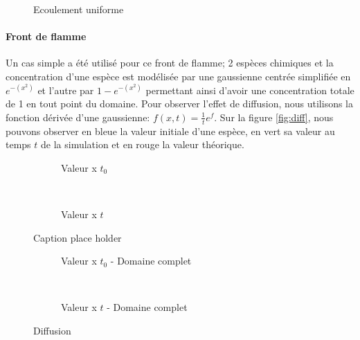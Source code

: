 \begin{figure}[ht]
  \centering
  \caption{\label{fig:uniform_flow}Ecoulement uniforme}
\end{figure}

\paragraph{Front de flamme}
Un cas simple a été utilisé pour ce front de flamme; 2 espèces chimiques et la concentration d'une espèce est modélisée par une gaussienne centrée simplifiée en $e^{-(x^2)}$ et l'autre par $1-e^{-(x^2)}$ permettant ainsi d'avoir une concentration totale de 1 en tout point du domaine. Pour observer l'effet de diffusion, nous utilisons la fonction dérivée d'une gaussienne: $f(x,t)=\frac{1}{t}e^{f}$. Sur la figure \ref{fig:diff}, nous pouvons observer en bleue la valeur initiale d'une espèce, en vert sa valeur au temps $t$ de la simulation et en rouge la valeur théorique.


\begin{figure}[t!]
  \centering
  \begin{subfigure}[b]{0.5\textwidth}
    \centering
    \caption{\label{fig:diff_0}Valeur x $t_0$}
  \end{subfigure}%
  ~ 
  \begin{subfigure}[b]{0.5\textwidth}
    \centering
    \caption{\label{fig:diff_325}Valeur x $t$}
  \end{subfigure}
  \caption{Caption place holder}
  \centering
  \begin{subfigure}[b]{0.5\textwidth}
    \centering
    \caption{\label{fig:diff_0_domain}Valeur x $t_0$ - Domaine complet}
  \end{subfigure}%
  ~ 
  \begin{subfigure}[b]{0.5\textwidth}
    \centering
    \caption{\label{fig:diff_325_domain}Valeur x $t$ - Domaine complet}
  \end{subfigure}
  \caption{\label{fig:diff_}Diffusion}
\end{figure}



